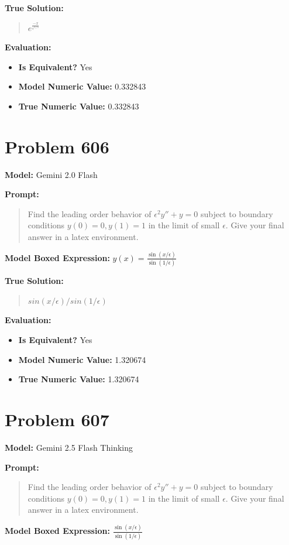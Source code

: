 \documentclass{article}
\begin{document}
\textbf{True Solution:}
\begin{quote}
$e^{\frac{-x}{\epsilon^{1/3}}}$
\end{quote}

\textbf{Evaluation:}
\begin{itemize}
\item \textbf{Is Equivalent?} Yes
\item \textbf{Model Numeric Value:} 0.332843
\item \textbf{True Numeric Value:} 0.332843
\end{itemize}
\vspace{1cm}
\section*{Problem 606}
\textbf{Model:} Gemini 2.0 Flash

\textbf{Prompt:}
\begin{quote}
Find the leading order behavior of $\epsilon^2 y'' + y = 0$ subject to boundary conditions $y(0)=0, y(1)=1$ in the limit of small $\epsilon$. Give your final answer in a \boxed latex environment.
\end{quote}
\textbf{Model Boxed Expression:} $y(x) = \frac{\sin(x/\epsilon)}{\sin(1/\epsilon)}$

\textbf{True Solution:}
\begin{quote}
$sin(x/\epsilon)/sin(1/\epsilon)$
\end{quote}

\textbf{Evaluation:}
\begin{itemize}
\item \textbf{Is Equivalent?} Yes
\item \textbf{Model Numeric Value:} 1.320674
\item \textbf{True Numeric Value:} 1.320674
\end{itemize}
\vspace{1cm}
\section*{Problem 607}
\textbf{Model:} Gemini 2.5 Flash Thinking

\textbf{Prompt:}
\begin{quote}
Find the leading order behavior of $\epsilon^2 y'' + y = 0$ subject to boundary conditions $y(0)=0, y(1)=1$ in the limit of small $\epsilon$. Give your final answer in a \boxed latex environment.
\end{quote}
\textbf{Model Boxed Expression:} $\frac{\sin(x/\epsilon)}{\sin(1/\epsilon)}$
\end{document}
